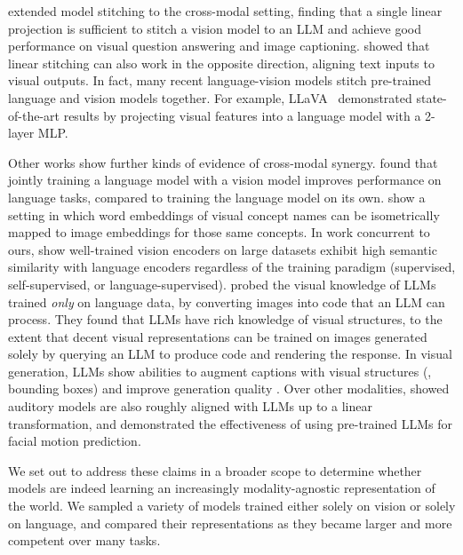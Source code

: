 \documentclass{article}
\theoremstyle{plain}
\theoremstyle{definition}
\theoremstyle{remark}
\begin{document}
\citet{merullo2022linearly} extended model stitching to the cross-modal setting, finding that a single linear projection is sufficient to stitch a vision model to an LLM and achieve good performance on visual question answering and image captioning. \citet{koh2023grounding} showed that linear stitching can also work in the opposite direction, aligning text inputs to visual outputs. 
In fact, many recent language-vision models stitch pre-trained language and vision models together. For example, LLaVA~\cite{liu2023llava} demonstrated state-of-the-art results by projecting visual features into a language model with a 2-layer MLP.

Other works show further kinds of evidence of cross-modal synergy. \citet{achiam2023gpt} found that jointly training a language model with a vision model improves performance on language tasks, compared to training the language model on its own. \citet{sorscher2022neural} show a setting in which word embeddings of visual concept names can be isometrically mapped to image embeddings for those same concepts. In work concurrent to ours, \citet{maniparambil2024vision} show well-trained vision encoders on large datasets exhibit high semantic similarity with language encoders regardless of the training paradigm (supervised, self-supervised, or language-supervised). \citet{sharma2024vision} probed the visual knowledge of LLMs trained \textit{only} on language data, by converting images into code that an LLM can process. They found that LLMs have rich knowledge of visual structures, to the extent that decent visual representations can be trained on images generated solely by querying an LLM to produce code and rendering the response. In visual generation, LLMs show abilities to augment captions with visual structures (\eg, bounding boxes) and improve generation quality \citep{betker2023improving,lian2023llm,lian2023llmvideo,wu2023self}. Over other modalities, \citet{ngo2024language} showed auditory models are also roughly aligned with LLMs up to a linear transformation, and \citet{ng2023can} demonstrated the effectiveness of using pre-trained LLMs for facial motion prediction.

We set out to address these claims in a broader scope to determine whether models are indeed learning an increasingly modality-agnostic representation of the world. We sampled a variety of models trained either solely on vision or solely on language, and compared their representations as they became larger and more competent over many tasks.
\end{document}
